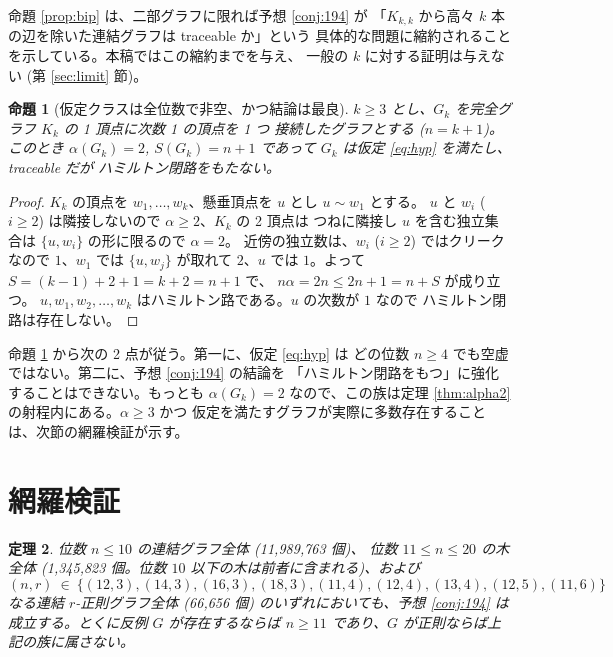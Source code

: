 \documentclass[paper=a4,fontsize=10.5pt,jafontsize=10.5pt]{jlreq}
\theoremstyle{plain}
\newtheorem{theorem}{定理}[section]
\newtheorem{proposition}[theorem]{命題}
\theoremstyle{definition}
\begin{document}
命題 \ref{prop:bip} は、二部グラフに限れば予想 \ref{conj:194} が
「$K_{k,k}$ から高々 $k$ 本の辺を除いた連結グラフは traceable か」という
具体的な問題に縮約されることを示している。本稿ではこの縮約までを与え、
一般の $k$ に対する証明は与えない (第 \ref{sec:limit} 節)。

\begin{proposition}[仮定クラスは全位数で非空、かつ結論は最良]\label{prop:sharp}
$k \ge 3$ とし、$G_k$ を完全グラフ $K_k$ の 1 頂点に次数 1 の頂点を 1 つ
接続したグラフとする ($n = k+1$)。このとき $\alpha(G_k) = 2$,
$S(G_k) = n+1$ であって $G_k$ は仮定 \eqref{eq:hyp} を満たし、traceable だが
ハミルトン閉路をもたない。
\end{proposition}

\begin{proof}
$K_k$ の頂点を $w_1, \dots, w_k$、懸垂頂点を $u$ とし $u \sim w_1$ とする。
$u$ と $w_i$ ($i \ge 2$) は隣接しないので $\alpha \ge 2$、$K_k$ の 2 頂点は
つねに隣接し $u$ を含む独立集合は $\{u, w_i\}$ の形に限るので $\alpha = 2$。
近傍の独立数は、$w_i$ ($i \ge 2$) ではクリークなので $1$、$w_1$ では
$\{u, w_j\}$ が取れて $2$、$u$ では $1$。よって
$S = (k-1) + 2 + 1 = k + 2 = n + 1$ で、
$n\alpha = 2n \le 2n + 1 = n + S$ が成り立つ。
$u, w_1, w_2, \dots, w_k$ はハミルトン路である。$u$ の次数が $1$ なので
ハミルトン閉路は存在しない。
\end{proof}

命題 \ref{prop:sharp} から次の 2 点が従う。第一に、仮定 \eqref{eq:hyp} は
どの位数 $n \ge 4$ でも空虚ではない。第二に、予想 \ref{conj:194} の結論を
「ハミルトン閉路をもつ」に強化することはできない。もっとも $\alpha(G_k) = 2$
なので、この族は定理 \ref{thm:alpha2} の射程内にある。$\alpha \ge 3$ かつ
仮定を満たすグラフが実際に多数存在することは、次節の網羅検証が示す。

\section{網羅検証}\label{sec:check}

\begin{theorem}\label{thm:main}
位数 $n \le 10$ の連結グラフ全体 (11,989,763 個)、
位数 $11 \le n \le 20$ の木全体 (1,345,823 個。位数 $10$
以下の木は前者に含まれる)、および
\[ (n, r) \ \in \ \{(12, 3), (14, 3), (16, 3), (18, 3), (11, 4), (12, 4), (13, 4), (12, 5), (11, 6)\} \]
なる連結 $r$-正則グラフ全体 (66,656 個) のいずれにおいても、予想
\ref{conj:194} は成立する。とくに反例 $G$ が存在するならば
$n \ge 11$ であり、$G$ が正則ならば上記の族に属さない。
\end{theorem}
\end{document}
